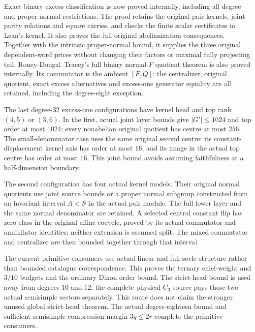 Exact binary excess classification is now proved internally, including
all degree and proper-normal restrictions. The proof retains the original
pair kernels, joint parity relations and square carries, and checks the
finite scalar certificates in Lean's kernel. It also proves the full
original abelianization consequences. Together with the intrinsic
proper-normal bound, it supplies the three original dependent-word prices
without changing their factors or maximal fully projecting tail.
Roney-Dougal--Tracey's full binary normal-$F$ quotient theorem is also
proved internally. Its commutator is the ambient $[F,Q]$; the centralizer,
original quotient, exact excess alternatives and excess-one generator
equality are all retained, including the degree-eight exception.

The last degree-$32$ excess-one configurations have kernel head and top
rank $(4,5)$ or $(3,6)$. In the first, actual joint layer bounds give
$|G'|\leq1024$ and top order at most $1024$; every nonabelian original
quotient has centre at most $256$. The small-denominator case uses the
same original second centre: its constant-displacement kernel axis has
order at most $16$, and its image in the actual top centre has order at
most $16$. This joint bound avoids assuming faithfulness at a
half-dimension boundary.

The second configuration has four actual kernel models. Their original
normal quotients use joint source bounds or a proper normal subgroup
constructed from an invariant interval $A<S$ in the actual pair module.
The full lower layer and the same normal denominator are retained.
A selected central constant flip has zero class in the original affine
cocycle, proved by its actual commutator and annihilator identities;
neither extension is assumed split. The mixed commutator and centralizer
are then bounded together through that interval.

The current primitive consumers use actual linear and full-socle structure
rather than bounded catalogue correspondence. This proves the ternary
chief-weight and $3/10$ budgets and the ordinary Dixon order bound.
The strict-head bound is used away from degrees $10$ and $12$; the complete
physical $C_3$ source pays those two actual semisimple sectors separately.
This route does not claim the stronger unused global strict-head theorem.
The actual degree-eighteen bound and sufficient semisimple compression
margin $3q\leq2r$ complete the primitive consumers.

